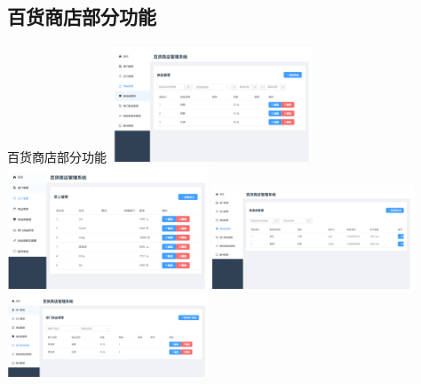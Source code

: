 \documentclass{ctexbeamer}
\begin{document}
\subsection{百货商店部分功能}
\begin{frame}{百货商店部分功能}
  \centering
  \includegraphics[width=0.45\textwidth]{fig/store4.png}
  \hspace{0.5cm}
  \includegraphics[width=0.45\textwidth]{fig/store3.png}
  \includegraphics[width=0.45\textwidth]{fig/store5.png}
  \hspace{0.5cm}
  \includegraphics[width=0.45\textwidth]{fig/store6.png}
  \vspace{0.3cm}
\end{frame}

\end{document}
